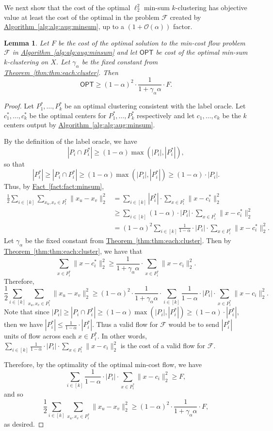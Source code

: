 \documentclass[11pt]{article}
\newtheorem{lemma}[theorem]{Lemma}
\newcommand{\namedref}[2]{\hyperref[#2]{#1~\ref*{#2}}}
\newcommand{\thmref}[1]{\namedref{Theorem}{thm:#1}}
\newcommand{\lemlab}[1]{\label{lem:#1}}
\newcommand{\factref}[1]{\namedref{Fact}{fact:#1}}
\renewcommand{\algref}[1]{\namedref{Algorithm}{alg:#1}}
\def \OPT    {\mdef{\mathsf{OPT}}}
\renewcommand{\O}[1]{\ensuremath{\mathcal{O}\left(#1\right)}}
\def \calF    {\mdef{\mathcal{F}}}
\newcommand{\mdef}[1]{{\ensuremath{#1}}\xspace}  %
\begin{document}
We next show that the cost of the optimal $\ell_2^2$ min-sum $k$-clustering has objective value at least the cost of the optimal in the problem $\calF$ created by \algref{alg:aug:minsum}, up to a $(1+\O{\alpha})$ factor.   
\begin{lemma}
\lemlab{lem:flow:to:cost:two}
Let $F$ be the cost of the optimal solution to the min-cost flow problem $\calF$ in \algref{alg:aug:minsum} and let $\OPT$ be cost of the optimal min-sum $k$-clustering on $X$. 
Let $\gamma_\alpha$ be the fixed constant from \thmref{thm:each:cluster}. 
Then  
\[\OPT\ge(1-\alpha)^2\cdot\frac{1}{1+\gamma_\alpha\alpha}\cdot F.\]
\end{lemma}
\begin{proof}
Let $P^*_1,\ldots,P^*_k$ be an optimal clustering consistent with the label oracle. 
Let $c^*_1,\ldots,c^*_k$ be the optimal centers for $P^*_1,\ldots,P^*_k$ respectively and let $c_1,\ldots,c_k$ be the $k$ centers output by \algref{alg:aug:minsum}. 

By the definition of the label oracle, we have 
\[|P_i\cap P^*_i|\ge(1-\alpha)\max(|P_i|,|P^*_i|),\]
so that
\[|P^*_i|\ge|P_i\cap P^*_i|\ge(1-\alpha)\max(|P_i|,|P^*_i|)\ge(1-\alpha)\cdot|P_i|.\]
Thus, by \factref{fact:minsum}, 
\begin{align*}
\frac{1}{2}\sum_{i\in[k]}\sum_{x_u,x_v\in P^*_i}\|x_u-x_v\|_2^2&=\sum_{i\in[k]}|P^*_i|\cdot\sum_{x\in P^*_i}\|x-c^*_i\|_2^2\\
&\ge\sum_{i\in[k]}(1-\alpha)\cdot|P_i|\cdot\sum_{x\in P^*_i}\|x-c^*_i\|_2^2\\
&=(1-\alpha)^2\sum_{i\in[k]}\frac{1}{1-\alpha}\cdot|P_i|\cdot\sum_{x\in P^*_i}\|x-c^*_i\|_2^2.
\end{align*}
Let $\gamma_\alpha$ be the fixed constant from \thmref{thm:each:cluster}. 
Then by \thmref{thm:each:cluster}, we have that
\[\sum_{x\in P^*_i}\|x-c^*_i\|_2^2\ge\frac{1}{1+\gamma_\alpha\alpha}\cdot\sum_{x\in P^*_i}\|x-c_i\|_2^2.\]
Therefore,
\[\frac{1}{2}\sum_{i\in[k]}\sum_{x_u,x_v\in P^*_i}\|x_u-x_v\|_2^2\ge(1-\alpha)^2\cdot\frac{1}{1+\gamma_\alpha\alpha}\cdot\sum_{i\in[k]}\frac{1}{1-\alpha}\cdot|P_i|\cdot\sum_{x\in P^*_i}\|x-c_i\|_2^2.\]
Note that since $|P_i|\ge|P_i\cap P^*_i|\ge(1-\alpha)\max(|P_i|,|P^*_i|)\ge(1-\alpha)\cdot|P^*_i|$, then we have $|P^*_i|\le\frac{1}{1-\alpha}\cdot|P^*_i|$. 
Thus a valid flow for $\calF$ would be to send $|P^*_i|$ units of flow across each $x\in P^*_i$. 
In other words, $\sum_{i\in[k]}\frac{1}{1-\alpha}\cdot|P_i|\cdot\sum_{x\in P^*_i}\|x-c_i\|_2^2$ is the cost of a valid flow for $\calF$. 

Therefore, by the optimality of the optimal min-cost flow, we have 
\[\sum_{i\in[k]}\frac{1}{1-\alpha}\cdot|P_i|\cdot\sum_{x\in P^*_i}\|x-c_i\|_2^2\ge F,\]
and so
\[\frac{1}{2}\sum_{i\in[k]}\sum_{x_u,x_v\in P^*_i}\|x_u-x_v\|_2^2\ge(1-\alpha)^2\cdot\frac{1}{1+\gamma_\alpha\alpha}\cdot F,\]
as desired.
\end{proof}
\end{document}
